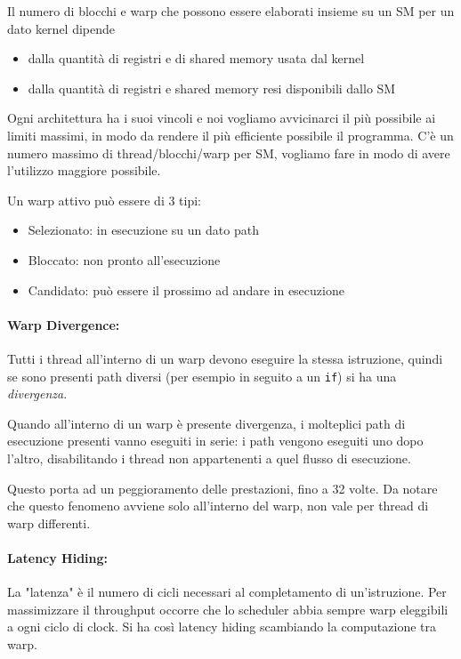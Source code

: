 Il numero di blocchi e warp che possono essere elaborati insieme su un SM per un dato kernel dipende
\begin{itemize}
	\item dalla quantità di registri e di shared memory usata dal kernel
	
	\item dalla quantità di registri e shared memory resi disponibili dallo SM
\end{itemize}

Ogni architettura ha i suoi vincoli e noi vogliamo avvicinarci il più possibile ai limiti massimi, in modo da rendere il più efficiente possibile il programma. C'è un numero massimo di thread/blocchi/warp per SM, vogliamo fare in modo di avere l'utilizzo maggiore possibile.

Un warp attivo può essere di 3 tipi: 
\begin{itemize}
	\item Selezionato: in esecuzione su un dato path
	
	\item Bloccato: non pronto all'esecuzione
	
	\item Candidato: può essere il prossimo ad andare in esecuzione
\end{itemize}

\paragraph{Warp Divergence:} Tutti i thread all'interno di un warp devono eseguire la stessa istruzione, quindi se sono presenti path diversi  (per esempio in seguito a un \texttt{if}) si ha una \textit{divergenza}. 

Quando all'interno di un warp è presente divergenza, i molteplici path di esecuzione presenti vanno eseguiti in serie: i path vengono eseguiti uno dopo l'altro, disabilitando i thread non appartenenti a quel flusso di esecuzione.

Questo porta ad un peggioramento delle prestazioni, fino a 32 volte. Da notare che questo fenomeno avviene solo all'interno del warp, non vale per thread di warp differenti.

\paragraph{Latency Hiding:} La "latenza" è il numero di cicli necessari al completamento di un'istruzione. Per massimizzare il throughput occorre che lo scheduler abbia sempre warp eleggibili a ogni ciclo di clock. Si ha così latency hiding scambiando la computazione tra warp.

